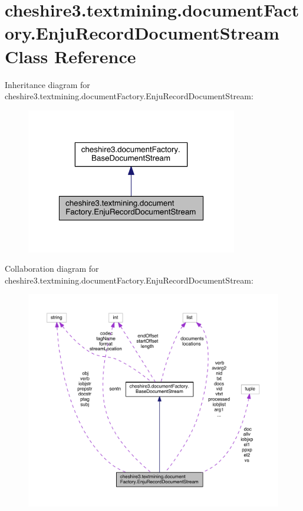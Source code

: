 \hypertarget{classcheshire3_1_1textmining_1_1document_factory_1_1_enju_record_document_stream}{\section{cheshire3.\-textmining.\-document\-Factory.\-Enju\-Record\-Document\-Stream Class Reference}
\label{classcheshire3_1_1textmining_1_1document_factory_1_1_enju_record_document_stream}
}


Inheritance diagram for cheshire3.\-textmining.\-document\-Factory.\-Enju\-Record\-Document\-Stream\-:
\nopagebreak
\begin{figure}[H]
\begin{center}
\leavevmode
\includegraphics[width=262pt]{classcheshire3_1_1textmining_1_1document_factory_1_1_enju_record_document_stream__inherit__graph}
\end{center}
\end{figure}


Collaboration diagram for cheshire3.\-textmining.\-document\-Factory.\-Enju\-Record\-Document\-Stream\-:
\nopagebreak
\begin{figure}[H]
\begin{center}
\leavevmode
\includegraphics[width=350pt]{classcheshire3_1_1textmining_1_1document_factory_1_1_enju_record_document_stream__coll__graph}
\end{center}
\end{figure}
